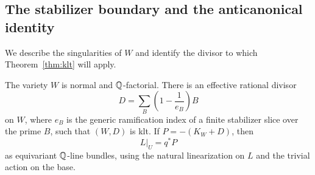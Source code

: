 \subsection{The stabilizer boundary and the anticanonical identity}\label{subsec:slices}

We describe the singularities of $W$ and identify the divisor to which Theorem~\ref{thm:klt} will apply.

\begin{proposition}\label{prop:boundary}
The variety $W$ is normal and $\mathbb Q$-factorial. There is an effective rational divisor
\[
D=\sum_B\left(1-\frac1{e_B}\right)B
\]
on $W$, where $e_B$ is the generic ramification index of a finite stabilizer slice over the prime $B$, such that $(W,D)$ is klt. If $P=-(K_W+D)$, then
\begin{equation}\label{eq:canonicalquotient}
L|_U=q^*P
\end{equation}
as equivariant $\mathbb Q$-line bundles, using the natural linearization on $L$ and the trivial action on the base.
\end{proposition}

